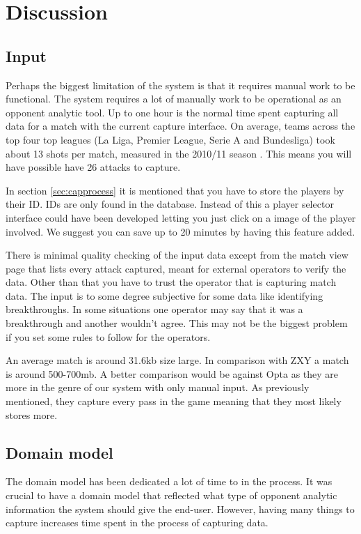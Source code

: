 \section{Discussion}
\subsection{Input}

Perhaps the biggest limitation of the system is that it requires manual work to be functional. The system requires a lot of manually work to be operational as an opponent analytic tool. Up to one hour is the normal time spent capturing all data for a match with the current capture interface. On average, teams across the top four top leagues (La Liga, Premier League, Serie A and Bundesliga) took about 13 shots per match, measured in the 2010/11 season \cite{soccerbynumbers}. This means you will have possible have 26 attacks to capture.

In section \ref{sec:capprocess} it is mentioned that you have to store the players by their ID. IDs are only found in the database. Instead of this a player selector interface could have been developed letting you just click on a image of the player involved. We suggest you can save up to 20 minutes by having this feature added.

There is minimal quality checking of the input data except from the match view page that lists every attack captured, meant for external operators to verify the data. Other than that you have to trust the operator that is capturing match data. The input is to some degree subjective for some data like identifying breakthroughs. In some situations one operator may say that it was a breakthrough and another wouldn't agree. This may not be the biggest problem if you set some rules to follow for the operators.

An average match is around 31.6kb size large. In comparison with ZXY a match is around 500-700mb. A better comparison would be against Opta as they are more in the genre of our system with only manual input. As previously mentioned, they capture every pass in the game meaning that they most likely stores more.

\subsection{Domain model}
The domain model has been dedicated a lot of time to in the process. It was crucial to have a domain model that reflected what type of opponent analytic information the system should give the end-user. However, having many things to capture increases time spent in the process of capturing data. 

